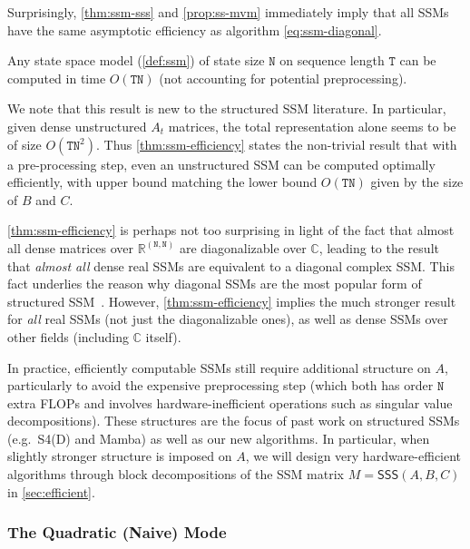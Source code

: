 Surprisingly, \ref{thm:ssm-sss} and \ref{prop:ss-mvm} immediately imply that all SSMs have the same asymptotic efficiency as algorithm \eqref{eq:ssm-diagonal}.

\begin{theorem}
  \label{thm:ssm-efficiency}
  Any state space model (\ref{def:ssm}) of state size $\mathtt{N}$ on sequence length $\mathtt{T}$ can be computed in time $O(\mathtt{TN})$ (not accounting for potential preprocessing).
\end{theorem}

We note that this result is new to the structured SSM literature. In particular, given dense unstructured $A_t$ matrices, the total representation alone seems to be of size $O(\mathtt{TN}^2)$.
Thus \ref{thm:ssm-efficiency} states the non-trivial result that with a pre-processing step, even an unstructured SSM can be computed optimally efficiently, with upper bound matching the lower bound $O(\mathtt{TN})$ given by the size of $B$ and $C$.

\begin{remark}
  \ref{thm:ssm-efficiency} is perhaps not too surprising in light of the fact that almost all dense matrices over $\mathbb{R}^{\mathtt{(N,N)}}$ are diagonalizable over $\mathbb{C}$,
  leading to the result that \emph{almost all} dense real SSMs are equivalent to a diagonal complex SSM. This fact underlies the reason why diagonal SSMs are the most popular form of structured SSM~\citep{gupta2022diagonal,gu2022parameterization,smith2023s5}.
  However, \ref{thm:ssm-efficiency} implies the much stronger result for \emph{all} real SSMs (not just the diagonalizable ones), as well as dense SSMs over other fields (including $\mathbb{C}$ itself).
\end{remark}

In practice, efficiently computable SSMs still require additional structure on $A$, particularly to avoid the expensive preprocessing step (which both has order $\mathtt{N}$ extra FLOPs and involves hardware-inefficient operations such as singular value decompositions). These structures are the focus of past work on structured SSMs (e.g.\ S4(D) and Mamba) as well as our new algorithms. In particular, when slightly stronger structure is imposed on $A$, we will design very hardware-efficient algorithms through block decompositions of the SSM matrix $M = \mathsf{SSS}(A, B, C)$ in \ref{sec:efficient}.

\subsubsection{The Quadratic (Naive) Mode}

